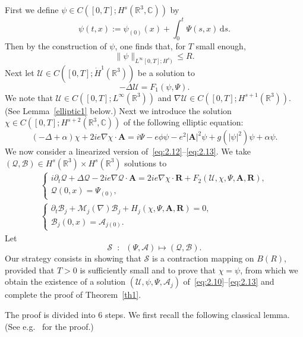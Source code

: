 \documentclass[10pt]{amsart}
\theoremstyle{definition}\newtheorem{defi}[theo]{Definition}\newtheorem{rema}[theo]{Remark}\newtheorem{exam}[theo]{Example}\newtheorem{exem}[theo]{Example}\newtheorem{nota}[theo]{Notation}
\newcommand{\BA}{\mathbf{A}}
\newcommand{\BR}{\mathbf{R}}
\newcommand{\R}{\mathbb{R}}
\newcommand{\Com}{\mathbb{C}}
\newcommand*{\dd}{\mathrm{d}}
\newcommand*{\ds}{\dd s}
\begin{document}
First we define $\psi\in C([0,T];H^s(\R^3,\Com))$ by
\begin{equation}\label{psi}
\psi(t,x):=\psi_{(0)}(x)+ \int_0^t \Psi(s,x) \,\ds.
\end{equation}
Then by the construction of $\psi$, one finds that, for $T$ small enough,
\[
\| \psi\|_{L^{\infty}[0,T]; H^s)} \le R.
\]
Next let $\mathcal{U}\in C([0,T];\dot{H}^1(\R^3))$ be a solution to
\begin{equation}\label{eq:3.1}
-\Delta \mathcal{U} = F_1(\psi,\Psi).
\end{equation}
We note that $\mathcal{U} \in C([0,T]; L^{\infty}(\R^3))$ and $\nabla \mathcal{U} \in C([0,T];H^{s+1}(\R^3))$. (See Lemma~\ref{elliptic1} below.) Next we introduce the solution $\chi \in C([0,T];H^{s+2}(\R^3,\Com))$ of the following elliptic equation:
\begin{equation}\label{eq:3.2}
(-\Delta+\alpha) \chi + 2 ie \nabla \chi\cdot \BA = i\Psi -e\phi \psi -e^2 |\BA|^2 \psi +g(|\psi|^2)\psi+\alpha \psi.
\end{equation}
We now consider a linearized version of~\eqref{eq:2.12}--\eqref{eq:2.13}. We take $(\mathcal{Q},\mathcal{B}) \in H^s(\R^3) \times H^s(\R^3)$ solutions to
\begin{gather}\label{eq:3.3}
\begin{cases}
i\partial_t \mathcal{Q}+\Delta \mathcal{Q}- 2i e \nabla \mathcal{Q} \cdot \BA = 2ie \nabla\chi \cdot \BR+F_2(\mathcal{U},\chi,\Psi,\BA, \BR), \\
\mathcal{Q}(0,x)=\Psi_{(0)},
\end{cases}
\\ \label{eq:3.4}
\begin{cases}
\partial_t \mathcal{B}_j+\mathcal{M}_j(\nabla)\mathcal{B}_j+H_j(\chi,\Psi, \BA, \BR)=0,\\
\mathcal{B}_j(0,x)=\mathcal{A}_{j(0)}.
\end{cases}
\end{gather}
Let
\[
\mathcal{S}\;\; :\;\; (\Psi,\mathcal{A}) \longmapsto (\mathcal{Q},\mathcal{B}).
\]
Our strategy consists in showing that $\mathcal{S}$ is a contraction mapping on $B(R)$, provided that $T>0$ is sufficiently small and to prove that $\chi=\psi$, from which we obtain the existence of a solution $(\mathcal{U}, \psi, \Psi, \mathcal{A}_j)$ of~\eqref{eq:2.10}--\eqref{eq:2.13} and complete the proof of Theorem~\ref{th1}.

The proof is divided into 6 steps. We first recall the following classical lemma. (See e.g.~\cite[Proposition~2.1.1, p.~98]{AG} for the proof.)
\end{document}
